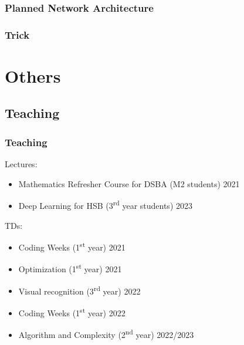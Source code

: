 \documentclass{beamer}
\begin{document}
	\subsubsection{Planned Network Architecture}
	\subsubsection{Trick}
	
	\section{Others}
	\subsection{Teaching}
	\begin{frame}
		\frametitle{Teaching}
		Lectures:
		\begin{itemize}
			\item Mathematics Refresher Course for DSBA (M2 students) 2021
			\item Deep Learning for HSB (3\textsuperscript{rd} year students) 2023
		\end{itemize}
		\vspace{0.5cm}
		TDs:
		\begin{itemize}
			\item Coding Weeks (1\textsuperscript{st} year) 2021
			\item Optimization (1\textsuperscript{st} year) 2021
			\item Visual recognition (3\textsuperscript{rd} year) 2022
			\item Coding Weeks (1\textsuperscript{st} year) 2022
			\item Algorithm and Complexity (2\textsuperscript{nd} year) 2022/2023
		\end{itemize}
	\end{frame}
	
\end{document}
